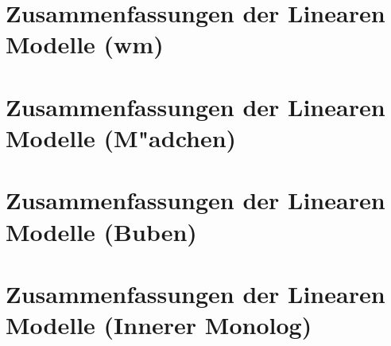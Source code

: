 \section{Zusammenfassungen der Linearen Modelle (wm)}





\section{Zusammenfassungen der Linearen Modelle (M"adchen)}





\section{Zusammenfassungen der Linearen Modelle (Buben)}




\section{Zusammenfassungen der Linearen Modelle (Innerer Monolog)}


